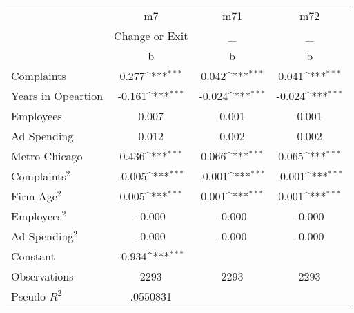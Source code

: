 {
\def\sym#1{\ifmmode^{#1}\else\(^{#1}\)\fi}
\begin{tabular}{l*{3}{c}}
\toprule
                    &          m7         &         m71         &         m72         \\
                    &Change or Exit         &           \_         &           \_         \\
                    &           b         &           b         &           b         \\
\midrule
Complaints          &       0.277\sym{***}&       0.042\sym{***}&       0.041\sym{***}\\
Years in Opeartion  &      -0.161\sym{***}&      -0.024\sym{***}&      -0.024\sym{***}\\
Employees           &       0.007         &       0.001         &       0.001         \\
Ad Spending         &       0.012         &       0.002         &       0.002         \\
Metro Chicago       &       0.436\sym{***}&       0.066\sym{***}&       0.065\sym{***}\\
Complaints$^{2}$    &      -0.005\sym{***}&      -0.001\sym{***}&      -0.001\sym{***}\\
Firm Age$^{2}$      &       0.005\sym{***}&       0.001\sym{***}&       0.001\sym{***}\\
Employees$^{2}$     &      -0.000         &      -0.000         &      -0.000         \\
Ad Spending$^{2}$   &      -0.000         &      -0.000         &      -0.000         \\
Constant            &      -0.934\sym{***}&                     &                     \\
\midrule
Observations        &        2293         &        2293         &        2293         \\
Pseudo \(R^{2}\)    &    .0550831         &                     &                     \\
\bottomrule
\end{tabular}
}
